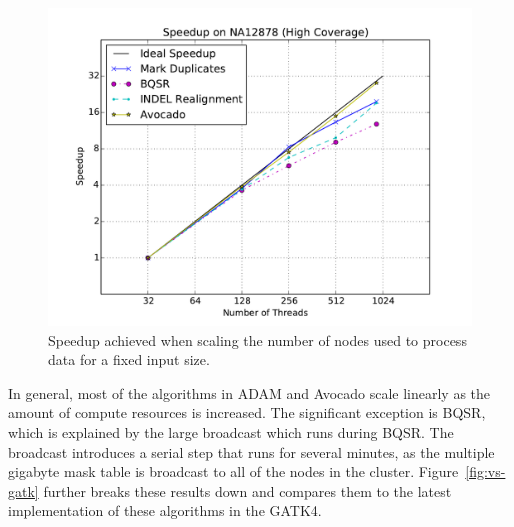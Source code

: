 \documentclass[phd]{ucbthesis}
\begin{document}
\begin{figure}[h]
  \begin{center}
    \includegraphics[width=0.6\linewidth]{graphs/speedup.pdf}
  \end{center}
  \caption{Speedup achieved when scaling the number of nodes used to process
    data for a fixed input size.}
  \label{fig:speedup}
\end{figure}

In general, most of the algorithms in ADAM and Avocado scale linearly as the
amount of compute resources is increased. The significant exception is BQSR,
which is explained by the large broadcast which runs during BQSR. The broadcast
introduces a serial step that runs for several minutes, as the multiple gigabyte
mask table is broadcast to all of the nodes in the cluster.
Figure~\ref{fig:vs-gatk} further breaks these results down and compares them to
the latest implementation of these algorithms in the GATK4.
\end{document}
